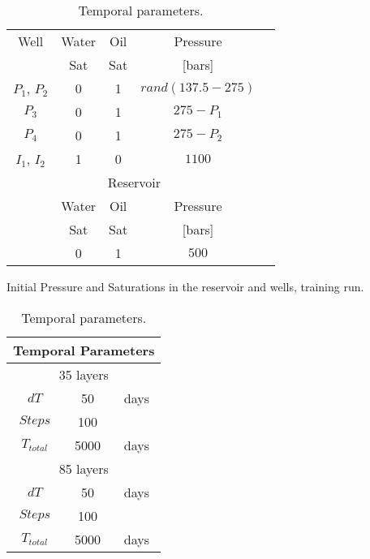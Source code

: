 \documentclass[12pt]{article}
\begin{document}
{\begin{table}[!ht]
\hspace{0cm}
\begin{minipage}{.5\textwidth}
\centering
\begin{tabular}{ |c|c|c|c|c|} 
\hline
Well&Water &Oil &Pressure\\
&Sat&Sat&[bars]\\
\hline
$P_1$, $P_2$&     0&    1 & $rand(137.5 - 275)$  \\  
$P_3$&     0&    1 & $275-P_1$  \\  
$P_4$& 0& 1& $275-P_2$ \\
$I_1$, $I_2$&     1&    0 & $1100$ \\  
\hline
\multicolumn{4}{|c|}{Reservoir}\\
\hline
&Water &Oil &Pressure\\
&Sat&Sat&[bars]\\
\hline
&0&1&$500$ \\
\hline
\end{tabular}
\caption{Initial Pressure and Saturations in the reservoir and wells, training run.}\label{table:spe10_p_t}
\end{minipage}%
\hspace{1cm}
\begin{minipage}{.4\textwidth}
\centering
\label{table:icw}
\begin{tabular}{ |c|c|c|} 
\hline
\multicolumn{3}{|c|}{Temporal Parameters}\\
\hline
\multicolumn{3}{|c|}{35 layers}\\
\hline

$dT$& 50&days\\  
$Steps$& 100&\\   
$T_{total}$&     5000& days\\
\hline
\multicolumn{3}{|c|}{85 layers}\\
\hline
$dT$& 50&days\\  
$Steps$& 100&\\   
$T_{total}$&     5000& days\\
\hline
\end{tabular}\caption{Temporal parameters.}
\label{table:bcspe_t}
\end{minipage}
\hspace{1cm} 
\end{table} 





}
\end{document}
